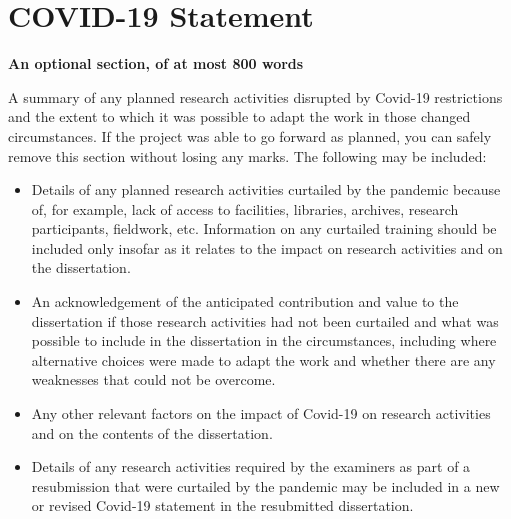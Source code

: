 \documentclass[oneside,%
                    author={Malak Hajji},
                    degree={BSc},
                    title={Designing An Accessible Computational Toolkit For Students},
                  subtitle={With Mixed Visual Abilities}]{dissertation}
\begin{document}

%




\chapter*{COVID-19 Statement}

{\bf An optional section, of at most 800 words} 
\vspace{1cm} 

\noindent
A summary of any planned research activities disrupted by Covid-19 restrictions and the extent to which it was possible to adapt the work in those changed circumstances. If the project was able to go forward as planned, you can safely remove this section without losing any marks. The following may be included:

\begin{itemize}
\item Details of any planned research activities curtailed by the pandemic because of, for example, lack of access to facilities, libraries, archives, research participants, fieldwork, etc. Information on any curtailed training should be included only insofar as it relates to the impact on research activities and on the dissertation.

\item An acknowledgement of the anticipated contribution and value to the dissertation if those research activities had not been curtailed and what was possible to include in the dissertation in the circumstances, including where alternative choices were made to adapt the work and whether there are any weaknesses that could not be overcome.

\item Any other relevant factors on the impact of Covid-19 on research activities and on the contents of the dissertation.

\item Details of any research activities required by the examiners as part of a resubmission that were curtailed by the pandemic may be included in a new or revised Covid-19 statement in the resubmitted dissertation.
\end{itemize}
\end{document}
